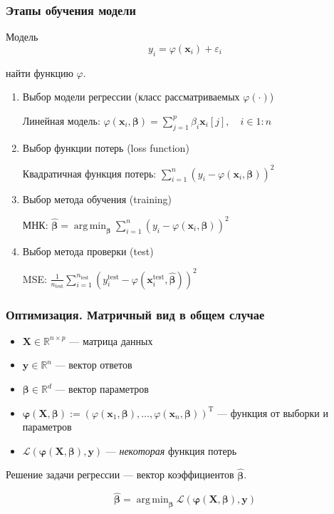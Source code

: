 \documentclass[ucs, notheorems, handout]{beamer}
\DeclareMathOperator*{\argmin}{arg\,min}
\newcommand{\betah}{\hat{\bm \beta}}
\newcommand{\betaa}{\bm{\beta}}
\newcommand{\X}{\bm{X}}
\begin{document}
	\begin{frame}
	    \frametitle{Этапы обучения модели}
	\begin{block}{Модель}
	$$
	y_i = \varphi(\mathbf x_i) + \varepsilon_i
	$$
	\end{block}
	\textbf{\color{blue}{Задача:}} найти функцию $\varphi$.
	\vspace{3mm}
	\begin{enumerate}
		\item Выбор модели регрессии (класс рассматриваемых $\varphi(\cdot)$)
		
		{\color{gray} Линейная модель: $\varphi(\mathbf x_i, \betaa) = \sum_{j = 1}^p \beta_i \mathbf x_i[j],\quad i \in 1:n $}
		
		\item Выбор функции потерь (loss function)
		
		{\color{gray} Квадратичная функция потерь: $\sum_{i = 1}^n(y_i - \varphi(\mathbf x_i, \betaa))^2$}
		\item Выбор метода обучения (training)
	
	{\color{gray} МНК: $\betah = \argmin_{\betaa}{\sum_{i = 1}^n(y_i - \varphi(\mathbf x_i, \betaa))^2}$}
		\item Выбор метода проверки (test)
	
	{\color{gray} MSE: $\tfrac{1}{n_{\text{test}}}\sum_{i = 1}^{n_{\text{test}}}(y^{\text{test}}_i - \varphi(\mathbf x_i^{\text{test}}, \betah))^2$}
	\end{enumerate}            
	\end{frame}
	
	
	\begin{frame}
	    \frametitle{Оптимизация. Матричный вид в общем случае}
	\begin{itemize}
		\item $\X \in \mathbb R^{n \times p}$ --- матрица данных
		\item $\bm y \in \mathbb R^n$ --- вектор ответов
		\item $\betaa \in \mathbb R^d$ --- вектор параметров 
		\item $\bm \varphi(\X, \betaa) := (\varphi(\mathbf x_1, \betaa),\ldots, \varphi(\mathbf x_n, \betaa) )^\mathrm T$ --- функция от выборки и параметров	\item $\mathcal L(\bm \varphi(\X, \betaa), \bm y)$ --- \textit{некоторая} функция потерь
	\end{itemize}
	Решение задачи регрессии --- вектор коэффициентов $\betah$. 
	\begin{block}{}
	$$\betah = \argmin_{\betaa}{\mathcal L(\bm \varphi(\X, \betaa), \bm y)}$$
	\end{block}
	\end{frame}
	
\end{document}
